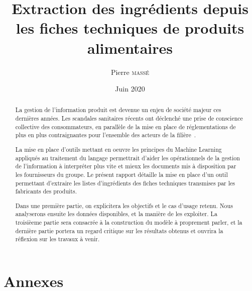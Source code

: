 \documentclass{report}
\title{Extraction des ingrédients depuis les fiches techniques de produits alimentaires}
\author{Pierre \textsc{massé}}
\date{Juin 2020}
\begin{document}
\maketitle

\large
\begin{abstract}   
    
    La gestion de l'information produit est devenue un enjeu de société majeur ces dernières années.
    Les scandales sanitaires récents ont déclenché une prise de conscience collective des consommateurs, en parallèle de la mise en place de réglementations de plus en plus contraignantes pour l'ensemble des acteurs de la filière~\cite{incotext}\cite{incoexpl}.


    La mise en place d'outils mettant en oeuvre les principes du Machine Learning appliqués au traitement du langage permettrait d'aider les opérationnels de la gestion de l'information à interpréter plus vite et mieux les documents mis à disposition par les fournisseurs du groupe.
    Le présent rapport détaille la mise en place d'un outil permettant d'extraire les listes d'ingrédients des fiches techniques transmises par les fabricants des produits.

    Dans une première partie, on explicitera les objectifs et le cas d'usage retenu.
    Nous analyserons ensuite les données disponibles, et la manière de les exploiter.
    La troisièeme partie sera consacrée à la construction du modèle à proprement parler, et la dernière partie portera un regard critique sur les résultats obtenus et ouvrira la réflexion sur les travaux à venir.

\end{abstract}
\normalsize

\begin{spacing}{1.0}
\tableofcontents
\end{spacing}









\appendix
\part{Annexes}
\end{document}
